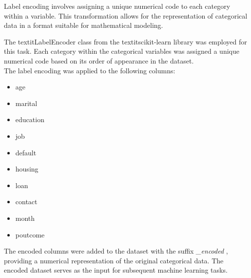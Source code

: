 \documentclass{article}
\begin{document}
Label encoding involves assigning a unique numerical code to each category within a variable. This transformation allows for the representation of categorical data in a format suitable for mathematical modeling.

The textit{LabelEncoder} class from the textit{scikit-learn} library was employed for this task. Each category within the categorical variables was assigned a unique numerical code based on its order of appearance in the dataset.
\\
The label encoding was applied to the following columns:
\begin{itemize}
    \item age
    \item marital
    \item education
    \item job
    \item default
    \item housing
    \item loan
    \item contact
    \item month
    \item poutcome
\end{itemize}

The encoded columns were added to the dataset with the suffix \textit{\_encoded} , providing a numerical representation of the original categorical data.
The encoded dataset serves as the input for subsequent machine learning tasks.
\end{document}
